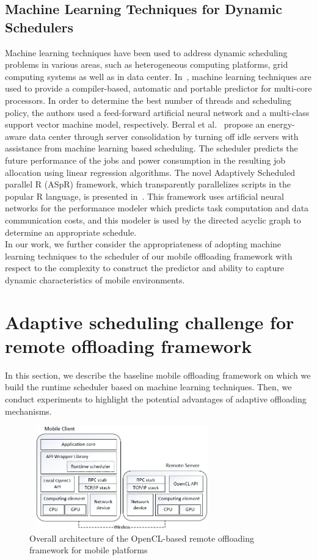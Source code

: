 \documentclass[10pt, conference, compsocconf]{IEEEtran}
\begin{document}
\subsection{Machine Learning Techniques for Dynamic Schedulers}
Machine learning techniques have been used to address dynamic scheduling
problems in various areas, such as heterogeneous computing platforms, grid
computing systems as well as in data center.
%
In~\cite{zheng}, machine learning techniques are used to provide a
compiler-based, automatic and portable predictor for multi-core
processors.
%
In order to determine the best number of threads and scheduling policy,
the authors used a feed-forward artificial neural network and a
multi-class support vector machine model, respectively.
%
Berral et al.~\cite{josep} propose an energy-aware
data center through server consolidation by turning off idle servers
with assistance from machine learning based scheduling.
%
The scheduler predicts the future performance of the jobs and power
consumption in the resulting job allocation using linear regression
algorithms.
%
The novel Adaptively Scheduled parallel R (ASpR) framework, which
transparently parallelizes scripts in the popular R language, is
presented in~\cite{jiangtian}.
%
This framework uses artificial neural networks for the performance
modeler which predicts task computation and data communication costs,
and this modeler is used by the directed acyclic graph to determine an
appropriate schedule.\\
%
\indent In our work, we further consider the appropriateness of adopting
machine learning techniques to the scheduler of our mobile offloading
framework with respect to the complexity to construct the predictor and
ability to capture dynamic characteristics of mobile environments.
%
\section{Adaptive scheduling challenge for remote offloading framework}
%
In this section, we describe the baseline mobile offloading framework
on which we build the runtime scheduler based on machine learning 
techniques.
%
Then, we conduct experiments to highlight the potential advantages of
adaptive offloading mechanisms.
%
\begin{figure}
\centering
\includegraphics[height=4.5cm, width=8.0cm]{Figure/figure1}
\caption{Overall architecture of the OpenCL-based remote offloading
framework for mobile platforms}
\end{figure}
%
\end{document}

